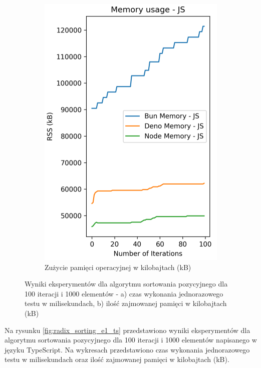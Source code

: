 \begin{figure}[H]
\begin{subfigure}[b]{0.42\textwidth}
    \includegraphics[width=\textwidth]{Figures/sorting/sorting_radix_100_1000_js_memory.png}
    \caption{Zużycie pamięci operacyjnej w kilobajtach (kB)}
    \label{fig:radix_sorting_e1_memory}
  \end{subfigure}
  \caption{Wyniki eksperymentów dla algorytmu sortowania pozycyjnego dla 100 iteracji i 1000 elementów - a) czas wykonania jednorazowego testu w milisekundach, b) ilość zajmowanej pamięci w kilobajtach (kB)}
  \label{fig:radix_sorting_e1}
\end{figure}

Na rysunku \ref{fig:radix_sorting_e1_ts} przedstawiono wyniki eksperymentów dla algorytmu sortowania pozycyjnego dla 100 iteracji i 1000 elementów napisanego w języku TypeScript. Na wykresach przedstawiono czas wykonania jednorazowego testu w milisekundach oraz ilość zajmowanej pamięci w kilobajtach (kB).


